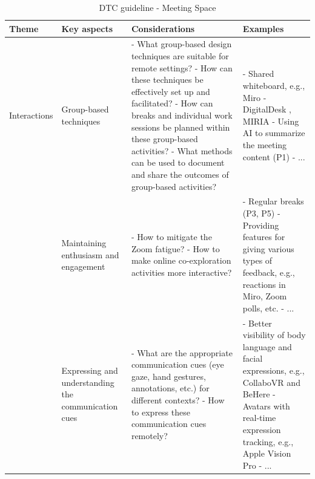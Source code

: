 \documentclass[11pt]{article}
\begin{document}
\clearpage
\begin{table}[ht]
\centering
\small
\caption{DTC guideline - Meeting Space}
\begin{tabular}{|l|p{3.2cm}|p{4.5cm}|p{4.5cm}|}
\hline
\textbf{Theme} & \textbf{Key aspects} & \textbf{Considerations} & \textbf{Examples} \\
\hline

Interactions & Group-based techniques 
& - What group-based design techniques are suitable for remote settings? \newline
- How can these techniques be effectively set up and facilitated? \newline
- How can breaks and individual work sessions be planned within these group-based activities? \newline
- What methods can be used to document and share the outcomes of group-based activities? \newline {~}
& - Shared whiteboard, e.g., Miro \newline
- DigitalDesk \cite{wellner1993digitaldesk}, MIRIA \cite{buschel2021miria} \newline
- Using AI to summarize the meeting content (P1) \newline
- ... \newline {~}\\


{~} & Maintaining enthusiasm and engagement 
& - How to mitigate the Zoom fatigue? \newline
- How to make online co-exploration activities more interactive?
& - Regular breaks (P3, P5) \newline
- Providing features for giving various types of feedback, e.g., reactions in Miro, Zoom polls, etc. \newline
- ... \newline {~}\\


{~} & Expressing and understanding the communication cues 
& - What are the appropriate communication cues (eye gaze, hand gestures, annotations, etc.) for different contexts? \newline
- How to express these communication cues remotely?
& - Better visibility of body language and facial expressions, e.g., CollaboVR \cite{he2020collabovr} and BeHere \cite{wang2023behere} \newline
- Avatars with real-time expression tracking, e.g., Apple Vision Pro \newline
- ... \newline {~}\\



\end{tabular}
\end{table}
\end{document}
